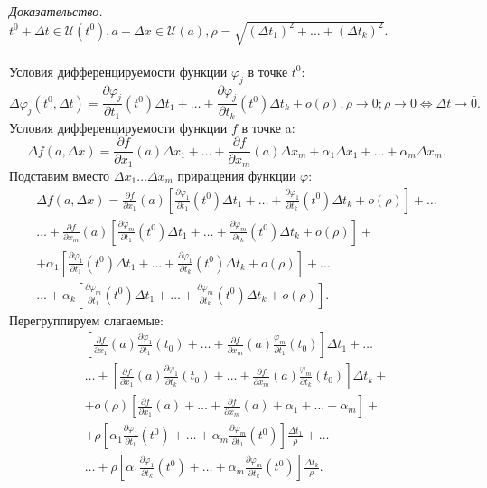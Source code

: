 \documentclass[a4paper,14pt]{article} %
\begin{document}
	 \textit{Доказательство.}\\
	 $t^0 + \Delta t \in \mathscr{U}(t^0), a + \Delta x \in \mathscr{U}(a), \rho = \sqrt{(\Delta t_1)^2 + \ldots + (\Delta t_k)^2}$.\\\\
	 Условия дифференцируемости функции $\varphi_j$ в точке $t^0$:
 	 \[\Delta \varphi_j(t^0, \Delta t) = \frac{\partial \varphi_j}{\partial t_1}(t^0)\Delta t_1 + \ldots + \frac{\partial \varphi_j}{\partial t_k}(t^0)\Delta t_k + o(\rho), \rho \to 0; \rho \to 0 \Leftrightarrow \Delta t \to \bar0.\]
	 Условия дифференцируемости функции $f$ в точке a:
	 \[\Delta f(a, \Delta x) = \frac {\partial f}{\partial x_1}(a)\Delta x_1 + \ldots + \frac {\partial f}{\partial x_m}(a)\Delta x_m + \alpha_1 \Delta x_1 + \ldots + \alpha_m \Delta x_m.\]
	 Подставим вместо $\Delta x_1 \ldots \Delta x_m$ приращения функции $\varphi$:\\
	 \begin{multline*}
	 	\Delta f(a, \Delta x) = \frac {\partial f}{\partial x_1}(a)\left[\frac{\partial \varphi_1}{\partial t_1}(t^0)\Delta t_1 + \ldots + \frac{\partial \varphi_1}{\partial t_k}(t^0)\Delta t_k + o(\rho)\right] + \ldots\\
	 	\ldots + \frac {\partial f}{\partial x_m}(a) \left[\frac{\partial \varphi_m}{\partial t_1}(t^0)\Delta t_1 + \ldots + \frac{\partial \varphi_m}{\partial t_k}(t^0)\Delta t_k + o(\rho)\right] +\\ +\alpha_1\left[\frac{\partial \varphi_1}{\partial t_1}(t^0)\Delta t_1 + \ldots + \frac{\partial \varphi_1}{\partial t_k}(t^0)\Delta t_k + o(\rho)\right] + \ldots \\
	 	\ldots + \alpha_k \left[\frac{\partial \varphi_m}{\partial t_1}(t^0)\Delta t_1 + \ldots + \frac{\partial \varphi_m}{\partial t_k}(t^0)\Delta t_k + o(\rho)\right].
	 \end{multline*}
	 Перегруппируем слагаемые:
	 \begin{multline*}
	 	 \left[\frac{\partial f}{\partial x_1}(a)\frac{\partial\varphi_1}{\partial t_1}(t_0) + \ldots + \frac{\partial f}{\partial x_m}(a)\frac{\varphi_m}{\partial t_1}(t_0)\right]\Delta t_1 + \ldots\\
	 	 \ldots + \left[\frac{\partial f}{\partial x_1}(a)\frac{\partial\varphi_1}{\partial t_k}(t_0) + \ldots + \frac{\partial f}{\partial x_m}(a)\frac{\varphi_m}{\partial t_k}(t_0)\right]\Delta t_k + \\
	 	 +o(\rho)\left[\frac{\partial f}{\partial x_1}(a) + \ldots + \frac{\partial f}{\partial x_m}(a) + \alpha_1 + \ldots + \alpha_m\right] + \\
	 	 +\rho\left[\alpha_1\frac{\partial \varphi_1}{\partial t_1}(t^0) + \ldots + \alpha_m \frac{\partial \varphi_m}{\partial t_1}(t^0)\right]\frac{\Delta t_1}{\rho} + \ldots \\
	 	 \ldots + \rho\left[\alpha_1\frac{\partial \varphi_1}{\partial t_k}(t^0) + \ldots + \alpha_m \frac{\partial \varphi_m}{\partial t_k}(t^0)\right]\frac{\Delta t_k}{\rho}.\\
	 \end{multline*}
 
\end{document}
